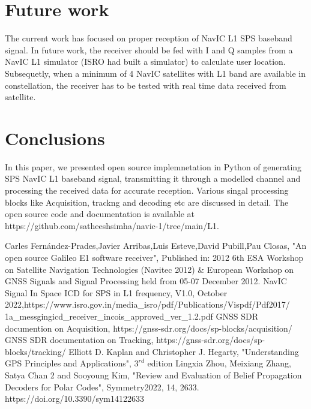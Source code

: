 \documentclass[conference]{IEEEtran}
\begin{document}
\section {Future work}
The current work has focused on proper reception of NavIC L1 SPS baseband signal. In future work, 
the receiver should be fed with I and Q samples from a NavIC L1 simulator (ISRO had built a 
simulator) to calculate user location. Subsequetly, when a minimum of 4 NavIC satellites with L1 
band are available in constellation, the receiver has to be tested with real time data received 
from satellite.
\section {Conclusions}
In this paper, we presented open source implemnetation in Python of generating SPS NavIC L1 baseband 
signal, transmitting it through a modelled channel and processing the received data for accurate reception.
Various singal processing blocks like Acquisition, trackng and decoding  etc are discussed in detail. The open source
code and documentation is available at https://github.com/satheeshsimha/navic-1/tree/main/L1.

\begin{thebibliography}{00}
 Carles Fernández-Prades,Javier Arribas,Luis Esteve,David Pubill,Pau Closas, "An open source Galileo E1 software receiver", Published in: 2012 6th ESA Workshop on Satellite Navigation Technologies (Navitec 2012) $\&$ European Workshop on GNSS Signals and Signal Processing held from 05-07 December 2012.
 NavIC Signal In Space ICD for SPS in L1 frequency, V1.0, October 2022,https://www.isro.gov.in/media\_isro/pdf/Publications/Vispdf/Pdf2017/\\1a\_messgingicd\_receiver\_incois\_approved\_ver\_1.2.pdf
 GNSS SDR documention on Acquisition, https://gnss-sdr.org/docs/sp-blocks/acquisition/
 GNSS SDR documentation on Tracking, https://gnss-sdr.org/docs/sp-blocks/tracking/
 Elliott D. Kaplan and Christopher J. Hegarty,  "Understanding {GPS} {P}rinciples and {A}pplications", $3^{rd}$ edition
 Lingxia Zhou, Meixiang Zhang, Satya Chan 2 and Sooyoung Kim, "Review and Evaluation of Belief Propagation Decoders for Polar Codes", Symmetry2022, 14, 2633. https://doi.org/10.3390/sym14122633
\end{thebibliography}
\vspace{12pt}
\end{document}
